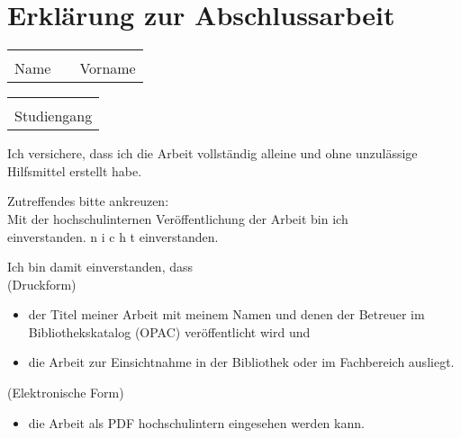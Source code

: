 \chapter*{Erkl\"arung zur Abschlussarbeit}
\label{cha:erklaerung}

\begin{tabular}{lp{1cm}l}
  \hspace{6cm} && \hspace{6cm} \\ \cline{1-1} \cline{3-3}
  Name && Vorname
\end{tabular}

\bigskip

\begin{tabular}{l}
  \hspace{6cm} \\ \cline{1-1}
  Studiengang
\end{tabular}

\bigskip
\bigskip

Ich versichere, dass ich die Arbeit vollst\"andig alleine und ohne unzul\"assige Hilfsmittel erstellt habe.

\bigskip
\bigskip

Zutreffendes bitte ankreuzen:\\
Mit der hochschulinternen Ver\"offentlichung der Arbeit bin ich\\
\Square \hspace{0.2cm} einverstanden. \hspace{1cm} \Square \hspace{0.2cm} n i c h t einverstanden.

\bigskip
\bigskip

Ich bin damit einverstanden, dass\\
(Druckform)
\begin{itemize}
  \item der Titel meiner Arbeit mit meinem Namen und denen der Betreuer im Bibliothekskatalog (OPAC) ver\"offentlicht wird und
  \item die Arbeit zur Einsichtnahme in der Bibliothek oder im Fachbereich ausliegt.
\end{itemize}
(Elektronische Form)
\begin{itemize}
  \item die Arbeit als PDF hochschulintern eingesehen werden kann.
\end{itemize}

